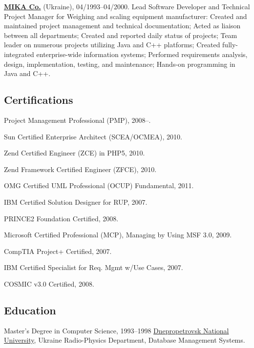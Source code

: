 \documentclass{vl}
\begin{document}
    \textbf{\href{https://www.mika.ua}{MIKA Co.}} (Ukraine), 04/1993--04/2000.
    Lead Software Developer and Technical Project Manager for Weighing and scaling equipment manufacturer:
    Created and maintained project management and technical documentation;
    Acted as liaison between all departments;
    Created and reported daily status of projects;
    Team leader on numerous projects utilizing Java and C++ platforms;
    Created fully-integrated enterprise-wide information systems;
    Performed requirements analysis, design, implementation, testing, and maintenance;
    Hands-on programming in Java and C++.

    \subsection*{Certifications}

    Project Management Professional (PMP), 2008--.

    Sun Certified Enterprise Architect (SCEA/OCMEA), 2010.

    Zend Certified Engineer (ZCE) in PHP5, 2010.

    Zend Framework Certified Engineer (ZFCE), 2010.

    OMG Certified UML Professional (OCUP) Fundamental, 2011.

    IBM Certified Solution Designer for RUP, 2007.

    PRINCE2 Foundation Certified, 2008.

    Microsoft Certified Professional (MCP), Managing by Using MSF 3.0, 2009.

    CompTIA Project+ Certified, 2007.

    IBM Certified Specialist for Req. Mgmt w/Use Cases, 2007.

    COSMIC v3.0 Certified, 2008.

    \subsection*{Education}

    \begin{samepage}
        Master's Degree in Computer Science, 1993--1998\newline
        \href{http://dnu.dp.ua/}{Dnepropetrovsk National University}, Ukraine\newline
        Radio-Physics Department, Database Management Systems.
    \end{samepage}
\end{document}
